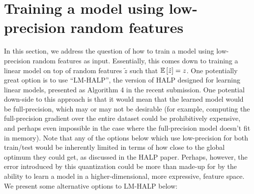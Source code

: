 \documentclass[12pt]{article}
\newcommand{\tz}{\tilde{z}}
\begin{document}
\section{Training a model using low-precision random features}
\label{sec:train}
In this section, we address the question of how to train a model using low-precision random features as input.  Essentially, this comes down to training a linear model on top of random features $\tz$ such that $\expect{}{\tz} = z$.  One potentially
great option is to use ``LM-HALP'', the version of HALP designed for learning linear models, presented as Algorithm 4 in the
recent submission.  One potential down-side to this approach is that it would mean that the learned model would be
full-precision, which may or may not be desirable (for example, computing the full-precision gradient over the entire dataset
could be prohibitively expensive, and perhaps even impossible in the case where the full-precision model doesn't fit in
memory).  Note that any of the options below which use low-precision for both train/test would be inherently limited in terms of
how close to the global optimum they could get, as discussed in the HALP paper.  Perhaps, however, the error introduced by this
quantization could be more than made-up for by the ability to learn a model in a higher-dimensional, more expressive, feature
space.  We present some alternative options to LM-HALP below:
\end{document}
